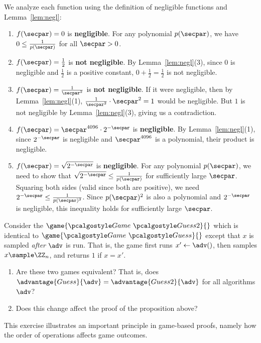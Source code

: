 \ifsolutions
\begin{mysolution}
  We analyze each function using the definition of negligible functions and Lemma~\ref{lem:negl}:
  \begin{enumerate}
    \item $f(\secpar) = 0$ is \textbf{negligible}.
    For any polynomial $p(\secpar)$, we have $0 \le \frac{1}{p(\secpar)}$ for all $\secpar > 0$.
    
    \item $f(\secpar) = \frac{1}{2}$ is \textbf{not negligible}.
    By Lemma~\ref{lem:negl}(3), since $0$ is negligible and $\frac{1}{2}$ is a positive constant, $0 + \frac{1}{2} = \frac{1}{2}$ is not negligible.
    
    \item $f(\secpar) = \frac{1}{\secpar^2}$ is \textbf{not negligible}.
    If it were negligible, then by Lemma~\ref{lem:negl}(1), $\frac{1}{\secpar^2} \cdot \secpar^2 = 1$ would be negligible.
    But $1$ is not negligible by Lemma~\ref{lem:negl}(3), giving us a contradiction.
    
    \item $f(\secpar) = \secpar^{4096} \cdot 2^{-\secpar}$ is \textbf{negligible}.
    By Lemma~\ref{lem:negl}(1), since $2^{-\secpar}$ is negligible and $\secpar^{4096}$ is a polynomial, their product is negligible.
    
    \item $f(\secpar) = \sqrt{2^{-\secpar}}$ is \textbf{negligible}.
    For any polynomial $p(\secpar)$, we need to show that $\sqrt{2^{-\secpar}} \le \frac{1}{p(\secpar)}$ for sufficiently large $\secpar$.
    Squaring both sides (valid since both are positive), we need $2^{-\secpar} \le \frac{1}{p(\secpar)^2}$.
    Since $p(\secpar)^2$ is also a polynomial and $2^{-\secpar}$ is negligible, this inequality holds for sufficiently large $\secpar$.
  \end{enumerate}
\end{mysolution}
\fi

\begin{exercise}\label{ex:guessing-game-equivalence}
  Consider the $\game{\Game~\algo{Guess2}}{}$ which is identical to $\game{\Game~\algo{Guess}}{}$ except that $x$ is sampled \emph{after} $\adv$ is run.
  That is, the game first runs $x' \gets \adv()$, then samples $x \sample \ZZ_n$, and returns $1$ if $x = x'$.
  \begin{enumerate}
    \item Are these two games equivalent? That is, does $\advantage{Guess}{\adv} = \advantage{Guess2}{\adv}$ for all algorithms $\adv$?
    \item Does this change affect the proof of the proposition above?
  \end{enumerate}
  
  This exercise illustrates an important principle in game-based proofs, namely how the order of operations affects game outcomes.
\end{exercise}

